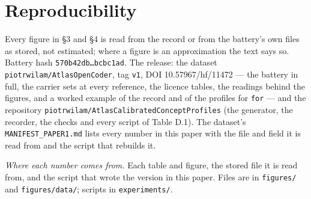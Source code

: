 \documentclass{article}
\begin{document}
\section{Reproducibility}

Every figure in \S3 and \S4 is read from the record or from the battery's own files as stored, not estimated; where a figure is an approximation the text says so. Battery hash \texttt{570b42db\ldots{}bcbc1ad}. The release: the dataset \texttt{piotrwilam/AtlasOpenCoder}, tag \texttt{v1}, DOI 10.57967/hf/11472 --- the battery in full, the carrier sets at every reference, the licence tables, the readings behind the figures, and a worked example of the record and of the profiles for \texttt{for} --- and the repository \texttt{piotrwilam/AtlasCalibratedConceptProfiles} (the generator, the recorder, the checks and every script of Table D.1). The dataset's \texttt{MANIFEST\_PAPER1.md} lists every number in this paper with the file and field it is read from and the script that rebuilds it.

\emph{Where each number comes from.} Each table and figure, the stored file it is read from, and the script that wrote the version in this paper. Files are in \texttt{figures/} and \texttt{figures/data/}; scripts in \texttt{experiments/}.
\end{document}
